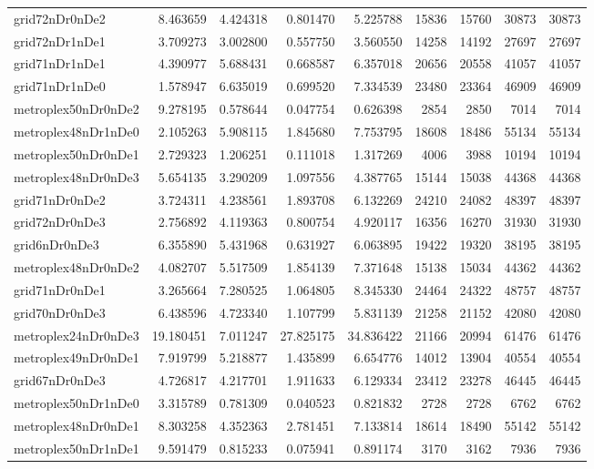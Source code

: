 \begin{longtable}{|l|r|r|r|r|r|r|r|r|}
grid72nDr0nDe2 & 8.463659 & 4.424318 & 0.801470 & 5.225788 & 15836 & 15760 & 30873 & 30873 \\
grid72nDr1nDe1 & 3.709273 & 3.002800 & 0.557750 & 3.560550 & 14258 & 14192 & 27697 & 27697 \\
grid71nDr1nDe1 & 4.390977 & 5.688431 & 0.668587 & 6.357018 & 20656 & 20558 & 41057 & 41057 \\
grid71nDr1nDe0 & 1.578947 & 6.635019 & 0.699520 & 7.334539 & 23480 & 23364 & 46909 & 46909 \\
metroplex50nDr0nDe2 & 9.278195 & 0.578644 & 0.047754 & 0.626398 & 2854 & 2850 & 7014 & 7014 \\
metroplex48nDr1nDe0 & 2.105263 & 5.908115 & 1.845680 & 7.753795 & 18608 & 18486 & 55134 & 55134 \\
metroplex50nDr0nDe1 & 2.729323 & 1.206251 & 0.111018 & 1.317269 & 4006 & 3988 & 10194 & 10194 \\
metroplex48nDr0nDe3 & 5.654135 & 3.290209 & 1.097556 & 4.387765 & 15144 & 15038 & 44368 & 44368 \\
grid71nDr0nDe2 & 3.724311 & 4.238561 & 1.893708 & 6.132269 & 24210 & 24082 & 48397 & 48397 \\
grid72nDr0nDe3 & 2.756892 & 4.119363 & 0.800754 & 4.920117 & 16356 & 16270 & 31930 & 31930 \\
grid6nDr0nDe3 & 6.355890 & 5.431968 & 0.631927 & 6.063895 & 19422 & 19320 & 38195 & 38195 \\
metroplex48nDr0nDe2 & 4.082707 & 5.517509 & 1.854139 & 7.371648 & 15138 & 15034 & 44362 & 44362 \\
grid71nDr0nDe1 & 3.265664 & 7.280525 & 1.064805 & 8.345330 & 24464 & 24322 & 48757 & 48757 \\
grid70nDr0nDe3 & 6.438596 & 4.723340 & 1.107799 & 5.831139 & 21258 & 21152 & 42080 & 42080 \\
metroplex24nDr0nDe3 & 19.180451 & 7.011247 & 27.825175 & 34.836422 & 21166 & 20994 & 61476 & 61476 \\
metroplex49nDr0nDe1 & 7.919799 & 5.218877 & 1.435899 & 6.654776 & 14012 & 13904 & 40554 & 40554 \\
grid67nDr0nDe3 & 4.726817 & 4.217701 & 1.911633 & 6.129334 & 23412 & 23278 & 46445 & 46445 \\
metroplex50nDr1nDe0 & 3.315789 & 0.781309 & 0.040523 & 0.821832 & 2728 & 2728 & 6762 & 6762 \\
metroplex48nDr0nDe1 & 8.303258 & 4.352363 & 2.781451 & 7.133814 & 18614 & 18490 & 55142 & 55142 \\
metroplex50nDr1nDe1 & 9.591479 & 0.815233 & 0.075941 & 0.891174 & 3170 & 3162 & 7936 & 7936 \\

\end{longtable}
